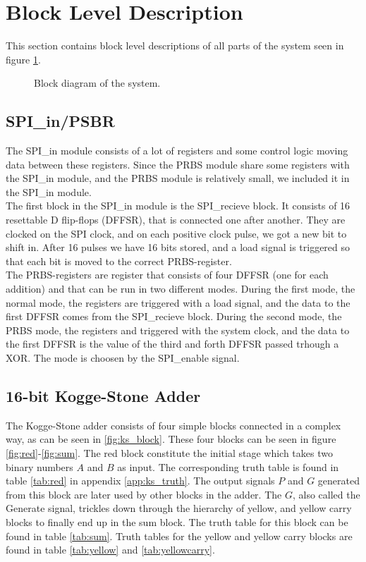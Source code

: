 \section{Block Level Description} \label{sec:block_level}
This section contains block level descriptions of all parts of the system seen in figure \ref{fig:top_level}.

\begin{figure}[H]
  \centering
  \captionsetup{justification=centering}
  \caption{Block diagram of the system.} \label{fig:top_level}
\end{figure}


\subsection{SPI\_in/PSBR}
The SPI\_in module consists of a lot of registers and some control logic moving data between these registers. Since the PRBS module share some registers with the SPI\_in module, and the PRBS module is relatively small, we included it in the SPI\_in module. \\
The first block in the SPI\_in module is the SPI\_recieve block. It consists of 16 resettable D flip-flops (DFFSR), that is connected one after another. They are clocked on the SPI clock, and on each positive clock pulse, we got a new bit to shift in. After 16 pulses we have 16 bits stored, and a load signal is triggered so that each bit is moved to the correct PRBS-register. \\
The PRBS-registers are register that consists of four DFFSR (one for each addition) and that can be run in two different modes. During the first mode, the normal mode, the registers are triggered with a load signal, and the data to the first DFFSR comes from the SPI\_recieve block. During the second mode, the PRBS mode, the registers and triggered with the system clock, and the data to the first DFFSR is the value of the third and forth DFFSR passed trhough a XOR. The mode is choosen by the SPI\_enable signal.

\subsection{16-bit Kogge-Stone Adder}
The Kogge-Stone adder consists of four simple blocks connected in a complex way, as can be seen in \ref{fig:ks_block}. These four blocks can be seen in figure \ref{fig:red}-\ref{fig:sum}. The red block constitute the initial stage which takes two binary numbers $A$ and $B$ as input. The corresponding truth table is found in table \ref{tab:red} in appendix \ref{app:ks_truth}. The output signals $P$ and $G$ generated from this block are later used by other blocks in the adder. The $G$, also called the Generate signal, trickles down through the hierarchy of yellow, and yellow carry blocks to finally end up in the sum block. The truth table for this block can be found in table \ref{tab:sum}. Truth tables for the yellow and yellow carry blocks are found in table \ref{tab:yellow} and \ref{tab:yellowcarry}.


